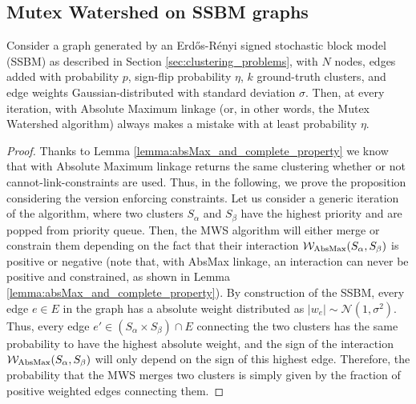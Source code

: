\subsection{Mutex Watershed on SSBM graphs}
\begin{prop}
Consider a graph generated by an Erd\H os-R\'enyi signed stochastic block model (SSBM) as described in Section \ref{sec:clustering_problems}, with $N$ nodes, edges added with probability $p$, sign-flip probability $\eta$, $k$ ground-truth clusters, and edge weights Gaussian-distributed with standard deviation $\sigma$. Then, at every iteration, \algname{} with Absolute Maximum linkage (or, in other words, the Mutex Watershed algorithm) always makes a mistake with at least probability $\eta$. 
\end{prop}
\begin{proof}
Thanks to Lemma \ref{lemma:absMax_and_complete_property} we know that \algname{} with Absolute Maximum linkage returns the same clustering whether or not cannot-link-constraints are used. Thus, in the following, we prove the proposition considering the version enforcing constraints.
Let us consider a generic iteration of the algorithm, where two clusters $S_\alpha$ and $S_\beta$ have the highest priority and are popped from priority queue. Then, the MWS algorithm will either merge or constrain them depending on the fact that their interaction $\mathcal{W}_{\mathrm{AbsMax}}(S_\alpha,S_\beta)$ is  positive or negative (note that, with AbsMax linkage, an interaction can never be positive and constrained, as shown in Lemma \ref{lemma:absMax_and_complete_property}).
By construction of the SSBM, every edge $e\in E$ in the graph has a absolute weight distributed as $|w_e|\sim \mathcal{N}(1,\sigma^2)$. Thus, every edge $e'\in(S_{\alpha} \times S_{\beta})\cap E$ connecting the two clusters has the same probability to have the highest absolute weight, and the sign of the interaction $\mathcal{W}_{\mathrm{AbsMax}}(S_\alpha,S_\beta)$ will only depend on the sign of this highest edge. Therefore, the probability that the MWS merges two clusters is simply given by the fraction of positive weighted edges connecting them.


\end{proof}
